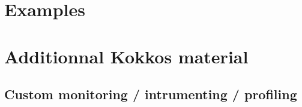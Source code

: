 \documentclass[9pt,hyperref={pdfpagemode=FullScreen,urlcolor=blue},usenames,xcolor=dvipsnames]{beamer}
\begin{document}
%

\section{Examples}



\section*{Additionnal Kokkos material}

%

%

\subsection{Custom monitoring / intrumenting / profiling}





\end{document}
